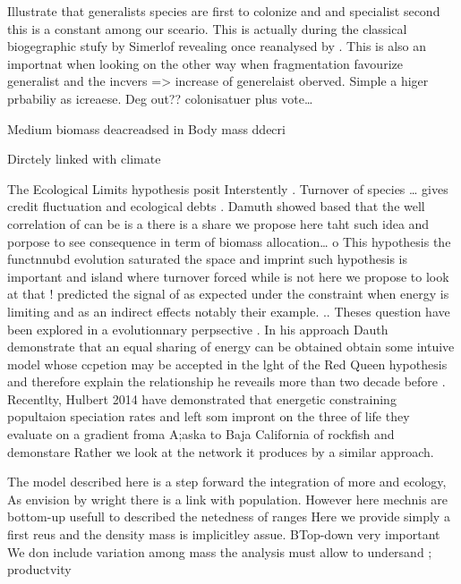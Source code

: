 Illustrate that generalists species are first to colonize and and
specialist second this is a constant among our sceario. This is actually
during the classical biogegraphic stufy by Simerlof revealing once
reanalysed by \citep{Piechnik2008}. This is also an importnat when
looking on the other way when fragmentation favourize generalist
\citep{Simberloff1969b} and the incvers =\textgreater{} increase of
generelaist oberved. Simple a higer prbabiliy as icreaese. Deg out??
colonisatuer plus vote\ldots{}

Medium biomass deacreadsed in Body mass ddecri

Dirctely linked with climate

The Ecological Limits hypothesis posit Interstently \citet{Rabosky2015}.
Turnover of species \ldots{} gives credit fluctuation and ecological
debts . Damuth showed based that the well correlation of can be is a
there is a share we propose here taht such idea and porpose to see
consequence in term of biomass allocation\ldots{} o This hypothesis the
functnnubd evolution saturated the space and imprint such hypothesis is
important and island where turnover forced while is not here we propose
to look at that ! \citet{Hurlbert2014} predicted the signal of as
expected under the constraint when energy is limiting and as an indirect
effects notably their example. .. Theses question have been explored in
a evolutionnary perpsective
\citep{Damuth2007, Hurlbert2014, Rabosky2015}. In his approach Dauth
demonstrate that an equal sharing of energy can be obtained obtain some
intuive model whose ccpetion may be accepted in the lght of the Red
Queen hypothesis and therefore explain the relationship he reveails more
than two decade before \citet{Damuth1981}. Recentlty, Hulbert 2014 have
demonstrated that energetic constraining popultaion speciation rates and
left som impront on the three of life they evaluate on a gradient froma
A;aska to Baja California of rockfish and demonstare Rather we look at
the network it produces by a similar approach.

The model described here is a step forward the integration of more and
ecology, As envision by wright there is a link with population. However
here mechnis are bottom-up usefull to described the netedness of ranges
\citep{Cirtwill2015} Here we provide simply a first reus and the density
mass is implicitley assue. BTop-down very important We don include
variation among mass\citep{Terborgh1971} the analysis must allow to
undersand \citep{Hatton2015}; productvity

